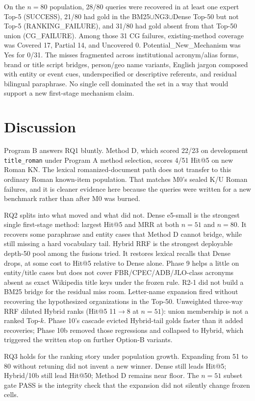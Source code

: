 \documentclass[10pt,letterpaper]{article}
\begin{document}
On the $n = 80$ population, 28/80 queries were recovered in at least one expert Top-5 (SUCCESS), 21/80 had gold in the BM25$\cup$NG3$\cup$Dense Top-50 but not Top-5 (RANKING\_FAILURE), and 31/80 had gold absent from that Top-50 union (CG\_FAILURE). Among those 31 CG failures, existing-method coverage was Covered 17, Partial 14, and Uncovered 0. Potential\_New\_Mechanism was Yes for 0/31. The misses fragmented across institutional acronym/alias forms, brand or title script bridges, person/geo name variants, English jargon composed with entity or event cues, underspecified or descriptive referents, and residual bilingual paraphrase. No single cell dominated the set in a way that would support a new first-stage mechanism claim.

\section*{Discussion}
Program B answers RQ1 bluntly. Method D, which scored 22/23 on development \texttt{title\_roman} under Program A method selection, scores 4/51 Hit@5 on new Roman KN. The lexical romanized-document path does not transfer to this ordinary Roman known-item population. That matches M0's sealed K/U Roman failures, and it is cleaner evidence here because the queries were written for a new benchmark rather than after M0 was burned.

RQ2 splits into what moved and what did not. Dense e5-small is the strongest single first-stage method: largest Hit@5 and MRR at both $n = 51$ and $n = 80$. It recovers some paraphrase and entity cases that Method D cannot bridge, while still missing a hard vocabulary tail. Hybrid RRF is the strongest deployable depth-50 pool among the fusions tried. It restores lexical recalls that Dense drops, at some cost to Hit@5 relative to Dense alone. Phase 9 helps a little on entity/title cases but does not cover FBR/CPEC/ADB/JLO-class acronyms absent as exact Wikipedia title keys under the frozen rule. R2-1 did not build a BM25 bridge for the residual miss room. Letter-name expansion fired without recovering the hypothesized organizations in the Top-50. Unweighted three-way RRF diluted Hybrid ranks (Hit@5 11$\to$8 at $n = 51$): union membership is not a ranked Top-$k$. Phase 10's cascade evicted Hybrid-tail golds faster than it added recoveries; Phase 10b removed those regressions and collapsed to Hybrid, which triggered the written stop on further Option-B variants.

RQ3 holds for the ranking story under population growth. Expanding from 51 to 80 without retuning did not invent a new winner. Dense still leads Hit@5; Hybrid/10b still lead Hit@50; Method D remains near floor. The $n = 51$ subset gate PASS is the integrity check that the expansion did not silently change frozen cells.
\end{document}
